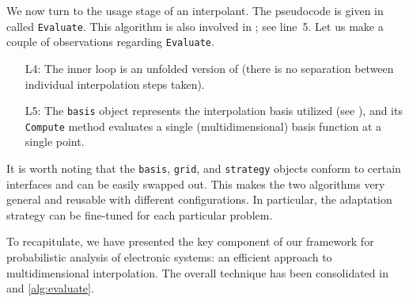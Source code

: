 We now turn to the usage stage of an interpolant. The pseudocode is given in
 called \texttt{Evaluate}. This algorithm is also involved in
; see line~5. Let us make a couple of observations regarding
\texttt{Evaluate}.

\begin{itemize}

\item[L4:] The inner loop is an unfolded version of  (there
is no separation between individual interpolation steps taken).

\item[L5:] The \texttt{basis} object represents the interpolation basis utilized
(see ), and its \texttt{Compute} method evaluates a single
(multidimensional) basis function at a single point.

\end{itemize}

It is worth noting that the \texttt{basis}, \texttt{grid}, and \texttt{strategy}
objects conform to certain interfaces and can be easily swapped out. This makes
the two algorithms very general and reusable with different configurations. In
particular, the adaptation strategy can be fine-tuned for each particular
problem.

To recapitulate, we have presented the key component of our framework for
probabilistic analysis of electronic systems: an efficient approach to
multidimensional interpolation. The overall technique has been consolidated in
 and \ref{alg:evaluate}.
